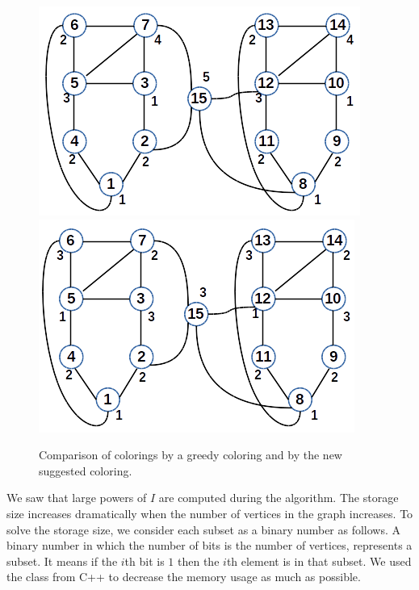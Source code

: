 \documentclass[12pt, twoside,a4paper,toc=bibliography]{scrbook}
\begin{document}
\begin{figure}
\centering
\includegraphics[width=0.48\linewidth]{coloring2}
\hfill
\includegraphics[width=0.48\linewidth]{coloring3}
\caption{Comparison of colorings by a greedy coloring and
by the new suggested coloring.}
\label{f.coloring.compared}
\end{figure}

We saw that large powers of $I$ are computed during the algorithm.
The storage size increases dramatically when the number of vertices
in the graph increases. To solve the storage size, we consider each 
subset as a binary number as follows. A binary number in which
the number of bits is the number of vertices, represents a subset.
It means if the $i$th bit is $1$ then the $i$th element is in that subset.
We used the class  from C++ to decrease the memory usage as much
as possible.
\end{document}
